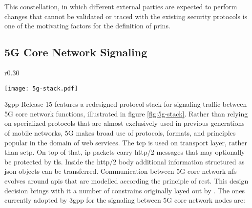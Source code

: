 This constellation, in which different external parties are expected to perform changes that cannot be validated or traced with the existing security protocols is one of the motivating factors for the definition of \gls{prins}.

\subsection{5G Core Network Signaling}

\begin{wrapfigure}{r}{0.30\textwidth}
    \begin{center}
    \texttt{[image: 5g-stack.pdf]}
    \end{center}
    \caption{5G Control Plane Protocol Stack, according to TS 29.573 (\cite{3gpp.29.573}, 11)}
    \label{fig:5g-stack}
\end{wrapfigure}

\gls{3gpp} Release 15 features a redesigned protocol stack for signaling traffic between 5G core network functions, illustrated in figure \ref{fig:5g-stack}.
Rather than relying on specialized protocols that are almost exclusively used in previous generations of mobile networks, 5G makes broad use of protocols, formats, and principles popular in the domain of web services.
The \gls{tcp} is used on transport layer, rather than \gls{sctp}.
On top of that, \gls{ip} packets carry \gls{http}/2 messages that may optionally be protected by \gls{tls}.
Inside the \gls{http}/2 body additional information structured as \gls{json} objects can be transferred.
Communication between 5G core network \glspl{nf} evolves around \glspl{api} that are modelled according the principle of \gls{rest}.
This design decision brings with it a number of constrains originally layed out by \cite{fielding2000arch}.
The ones currently adopted by \gls{3gpp} for the signaling between 5G core network nodes are:\\

